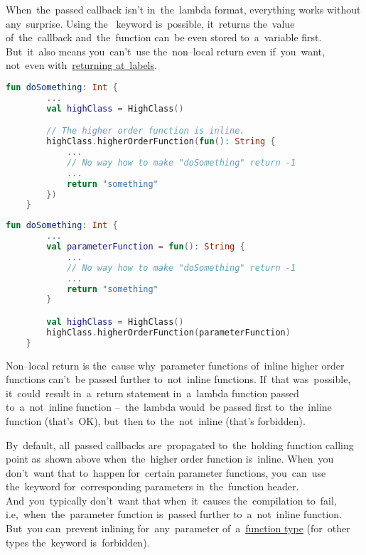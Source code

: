 \note When~the~passed callback isn't in~the~lambda format, everything works without any~surprise.
Using the~ keyword is~possible, it~returns the~value of~the~callback and~the~function can~be even stored to~a~variable first.
But~it~also means you~can't~use \mbox{the non--local} return even if~you~want, not~even with~\hyperref[kotlinreturnatlabel]{returning at~labels}.

\example
\begin{lstlisting}[language=Kotlin, title={Higher order function call with standard anonymous function}]
   fun doSomething: Int {
        ...
        val highClass = HighClass()

        // The higher order function is inline.
        highClass.higherOrderFunction(fun(): String {
            ...
            // No way how to make "doSomething" return -1
            ...
            return "something"
        })
    }
\end{lstlisting}
\begin{lstlisting}[language=Kotlin, title={Equivalent with the function stored in a variable}]
   fun doSomething: Int {
        ...
        val parameterFunction = fun(): String {
            ...
            // No way how to make "doSomething" return -1
            ...
            return "something"
        }

        val highClass = HighClass()
        highClass.higherOrderFunction(parameterFunction)
    }
\end{lstlisting}

\note \mbox{Non--local} return is the~cause why~parameter functions of~inline higher order functions can't~be passed further to~not~inline functions.
If~that was~possible, it~could~result in~a~return statement in~a~lambda function passed to~a~not~inline function --~the~lambda would~be passed first to~the~inline function \mbox{(that's OK),} but~then to~the~not~inline (that's forbidden).

\label{kotlinoinline}
By~default, all~passed callbacks are~propagated to~the~holding function calling point as~shown above when~the~higher order function is~inline.
When~you don't~want that to~happen for~certain parameter functions, you~can~use the~keyword  for~corresponding parameters in~the~function header.
And~you~typically don't~want that when~it~causes the~compilation to~fail, i.e,~when~the~parameter function is~passed further to~a~not~inline function.
But~you can~prevent inlining for~any~parameter of~a~\hyperref[kotlinanonymousfunction]{function type} (for~other types the~keyword is~forbidden).

